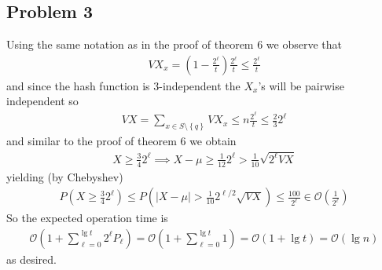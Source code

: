 \subsection*{Problem 3}
Using the same notation as in the proof of theorem 6 we observe that
\begin{align*}
	VX_x=\left( 1-\frac{2^{\ell}}{t} \right)\frac{2^{\ell}}{t} \leq \frac{2^{\ell}}{t}
\end{align*}
and since the hash function is 3-independent the $X_x$'s will be pairwise independent so
\begin{align*}
	VX=\sum_{x \in S \setminus \left\{ q \right\}}^{}VX_x \leq n \frac{2^{\ell}}{t} \leq \frac{2}{3}2^{\ell}
\end{align*}
and similar to the proof of theorem 6 we obtain
\begin{align*}
	X \geq \frac{3}{4}2^{\ell} \implies X-\mu \geq \frac{1}{12}2^{\ell} > \frac{1}{10} \sqrt{2^{\ell} VX}
\end{align*}
yielding (by Chebyshev)
\begin{align*}
	P\left( X \geq \frac{3}{4}2^{\ell} \right) \leq 
	P\left( |X-\mu| > \frac{1}{10}2^{\ell/2} \sqrt{VX} \right) \leq \frac{100}{2^{\ell}} \in \mathcal{O}\left( \frac{1}{2^{\ell}} \right)
\end{align*}
So the expected operation time is
\begin{align*}
	\mathcal{O}\left( 1+\sum_{\ell=0}^{\lg t}2^{\ell}P_{\ell} \right)= 
	\mathcal{O}\left( 1+\sum_{\ell=0}^{\lg t} 1 \right) =
	\mathcal{O} \left( 1+ \lg t \right)= \mathcal{O}\left( \lg n \right)
\end{align*}
as desired.
